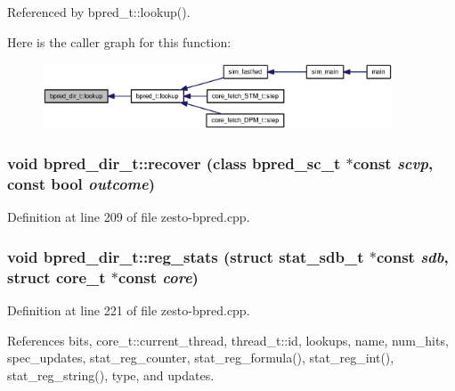Referenced by bpred\_\-t::lookup().

Here is the caller graph for this function:\nopagebreak
\begin{figure}[H]
\begin{center}
\leavevmode
\includegraphics[width=295pt]{classbpred__dir__t_dba28e61c7848e2fd5b9e66a6a1436c4_icgraph}
\end{center}
\end{figure}
\subsubsection[{recover}]{\setlength{\rightskip}{0pt plus 5cm}void bpred\_\-dir\_\-t::recover (class {\bf bpred\_\-sc\_\-t} $\ast$const  {\em scvp}, \/  const bool {\em outcome})\hspace{0.3cm}{\tt  [virtual]}}\label{classbpred__dir__t_129ea8908118df7d544af134f418f051}




Definition at line 209 of file zesto-bpred.cpp.
\subsubsection[{reg\_\-stats}]{\setlength{\rightskip}{0pt plus 5cm}void bpred\_\-dir\_\-t::reg\_\-stats (struct {\bf stat\_\-sdb\_\-t} $\ast$const  {\em sdb}, \/  struct {\bf core\_\-t} $\ast$const  {\em core})\hspace{0.3cm}{\tt  [virtual]}}\label{classbpred__dir__t_319dc721621dfdd5024c3aa7efd966dd}




Definition at line 221 of file zesto-bpred.cpp.

References bits, core\_\-t::current\_\-thread, thread\_\-t::id, lookups, name, num\_\-hits, spec\_\-updates, stat\_\-reg\_\-counter, stat\_\-reg\_\-formula(), stat\_\-reg\_\-int(), stat\_\-reg\_\-string(), type, and updates.
